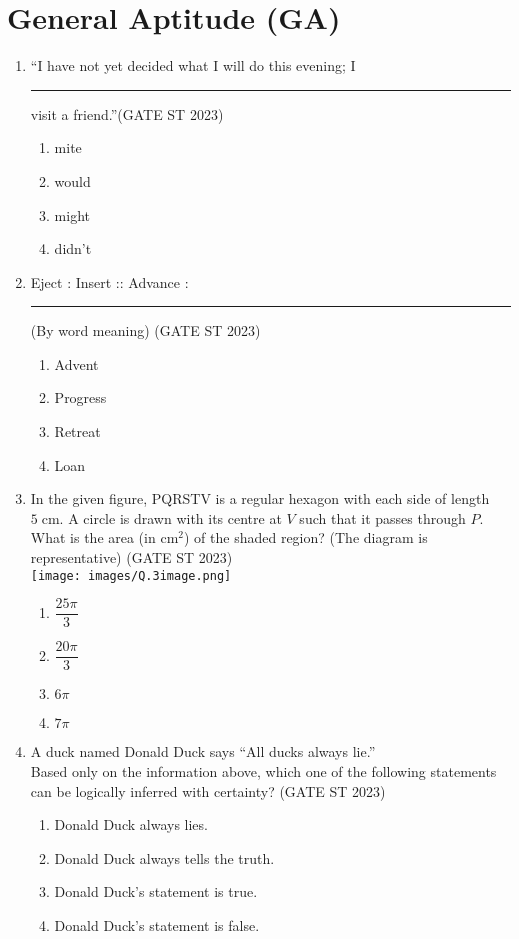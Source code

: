 \documentclass[journal]{IEEEtran}
\begin{document}
\section*{General Aptitude (GA)}
\begin{enumerate}[label=\textbf{Q.\arabic*.}, start=1, align=left, itemsep=2em]

\item ``I have not yet decided what I will do this evening; I \rule{2cm}{0.1pt} visit a friend.''\hfill(GATE ST 2023)
\begin{enumerate}[label=(\Alph*)]
\item mite
\item would
\item might
\item didn't
\end{enumerate}


\item Eject : Insert :: Advance : \rule{2cm}{0.1pt}\newline
(By word meaning) \hfill(GATE ST 2023)
\begin{enumerate}[label=(\Alph*)]
    \item Advent
    \item Progress
    \item Retreat
    \item Loan
\end{enumerate}

\item In the given figure, PQRSTV is a regular hexagon with each side of length $5\;\mathrm{cm}$. A circle is drawn with its centre at $V$ such that it passes through $P$. What is the area (in $\mathrm{cm}^2$) of the shaded region? (The diagram is representative) \hfill(GATE ST 2023)\\[1em] 

    \texttt{[image: images/Q.3image.png]}
   
\begin{enumerate}[label=(\Alph*)]
    \item  $\dfrac{25\pi}{3}$
    \item  $\dfrac{20\pi}{3}$
    \item  $6\pi$
    \item  $7\pi$
\end{enumerate}

\item A duck named Donald Duck says ``All ducks always lie.''\\
Based only on the information above, which one of the following statements can be logically inferred with certainty? 
\hspace*{15.7cm}(GATE ST 2023)
\begin{enumerate}[label=(\Alph*)]
    \item Donald Duck always lies.
    \item Donald Duck always tells the truth.
    \item Donald Duck's statement is true.
    \item Donald Duck's statement is false.
\end{enumerate}


\end{enumerate}
\end{document}
